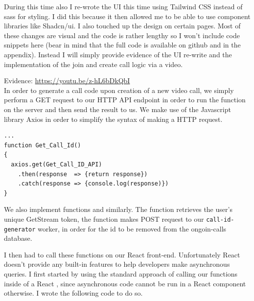 During this time also I re-wrote the UI this time using 
Tailwind CSS instead of sass for styling. I did this because
it then allowed me to be able to use component libraries like
Shadcn/ui. I also touched up the design on certain pages. 
Most of these changes are visual and the code is rather lengthy 
so I won't include code snippets here 
(bear in mind that the full code is available 
on github and in the appendix). Instead I will simply provide 
evidence of the UI re-write and the implementation of the join
and create call logic via a video.\\ 
\vspace{0.2cm}

{\sffamily Evidence:} \url{https://youtu.be/z-hL6bDkQbI}
\\

In order to generate a call code upon creation of a new 
video call, we simply perform a GET request to our HTTP API
endpoint in order to run the 
function on the server and then send the result to us. We make
use of the Javascript library Axios in order to simplify 
the syntax of making a HTTP request.

\begin{verbatim}
...
function Get_Call_Id()
{
  axios.get(Get_Call_ID_API)
    .then(response  => {return response})
    .catch(response => {console.log(response)})
}
\end{verbatim}

We also implement functions  and
 similarly. The 
function retrieves the user's unique GetStream token, the
 function makes POST request to our 
\texttt{call-id-generator} worker, in order for the id to be
removed from the ongoin-calls database. \\ \vspace{0.2cm}

I then had to call these functions on our React front-end.
Unfortunately React doesn't provide any built-in features to 
help developers make asynchronous queries. I first started 
by using the standard approach of calling our functions
inside of a React , since asynchronous code
cannot be run in a React component otherwise. I wrote the 
following code to do so.

